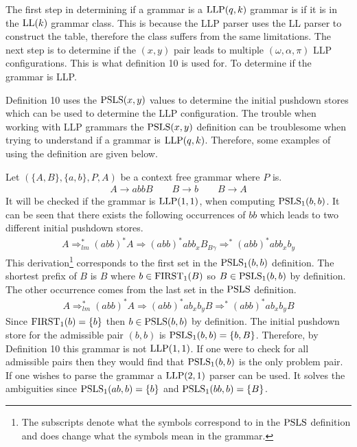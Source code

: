 The first step in determining if a grammar is a $\text{LLP}(q,k)$ grammar is if it is in the $\text{LL}(k)$ grammar class. This is because the LLP parser uses the LL parser to construct the table, therefore the class suffers from the same limitations. The next step is to determine if the $(x, y)$ pair leads to multiple $(\omega, \alpha, \pi)$ LLP configurations. This is what definition 10 \cite[13]{Vagner2007} is used for. To determine if the grammar is LLP.

Definition 10 \cite[13]{Vagner2007} uses the $\text{PSLS}(x, y)$ \cite[12]{Vagner2007} values to determine the initial pushdown stores which can be used to determine the LLP configuration. The trouble when working with LLP grammars the $\text{PSLS}(x, y)$ definition can be troublesome when trying to understand if a grammar is $\text{LLP}(q, k)$. Therefore, some examples of using the definition are given below.

\begin{example}
    \label{ex:llp21}
    Let $(\{A, B\}, \{a, b\}, P, A)$ be a context free grammar where $P$ is.
    \begin{gather*}
        A \to a b b B \qquad B \to b \qquad B \to A
    \end{gather*}
    It will be checked if the grammar is $\text{LLP}(1, 1)$, when computing $\text{PSLS}_1(b,b)$. It can be seen that there exists the following occurrences of $bb$ which leads to two different initial pushdown stores.
    \begin{align*}
        A \Rightarrow_{lm}^* (abb)^*A \Rightarrow (abb)^*abb_xB_{B\gamma} \Rightarrow^* (abb)^*abb_xb_y
    \end{align*}
    This derivation\footnote{The subscripts denote what the symbols correspond to in the $\text{PSLS}$ definition and does change what the symbols mean in the grammar.} corresponds to the first set in the $\text{PSLS}_1(b, b)$ definition. The shortest prefix of $B$ is $B$ where $b \in \text{FIRST}_1(B)$ so $B \in \text{PSLS}_1(b,b)$ \cite[2]{errata:Vagner2007} by definition. The other occurrence comes from the last set in the $\text{PSLS}$ definition.
    \begin{align*}
        A \Rightarrow_{lm}^* (abb)^*A \Rightarrow (abb)^*ab_xb_yB \Rightarrow^* (abb)^*ab_xb_yB
    \end{align*}
    Since $\text{FIRST}_1(b) = \{b\}$ then $b \in \text{PSLS}(b, b)$ by definition. The initial pushdown store for the admissible pair $(b, b)$ is $\text{PSLS}_1(b, b) = \{b, B\}$. Therefore, by Definition 10 \cite[13]{Vagner2007} this grammar is not $\text{LLP}(1, 1)$. If one were to check for all admissible pairs then they would find that $\text{PSLS}_1(b,b)$ is the only problem pair. If one wishes to parse the grammar a $\text{LLP}(2, 1)$ parser can be used. It solves the ambiguities since $\text{PSLS}_1(ab, b) = \{b\}$ and $\text{PSLS}_1(bb, b) = \{B\}$.
\end{example}

